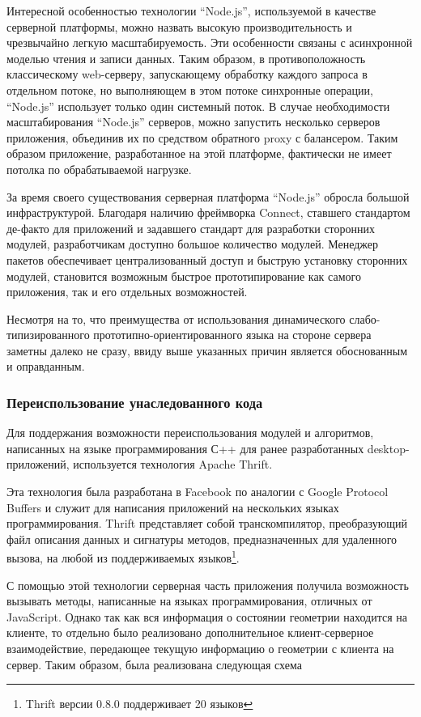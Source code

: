 \documentclass[12pt, a4paper]{article}
\begin{document}
Интересной особенностью технологии ``Node.js'', используемой в качестве серверной
платформы, можно назвать высокую производительность и чрезвычайно легкую
масштабируемость. Эти особенности связаны с асинхронной моделью чтения и записи
данных. Таким образом, в противоположность классическому web-серверу,
запускающему обработку каждого запроса в отдельном потоке, но выполняющем в этом
потоке синхронные операции, ``Node.js'' использует только один системный поток.
В случае необходимости масштабирования ``Node.js'' серверов, можно запустить
несколько серверов приложения, объединив их по средством обратного proxy с
балансером. Таким образом приложение, разработанное на этой платформе,
фактически не имеет потолка по обрабатываемой нагрузке.

За время своего существования серверная платформа ``Node.js'' обросла большой
инфраструктурой. Благодаря наличию фреймворка Connect, ставшего стандартом
де-факто для приложений и задавшего стандарт для разработки сторонних модулей,
разработчикам доступно большое количество модулей. Менеджер пакетов обеспечивает
централизованный доступ и быструю установку сторонних модулей, становится
возможным быстрое прототипирование как самого приложения, так и его отдельных
возможностей.

Несмотря на то, что преимущества от использования динамического
слабо-типизированного прототипно-ориентированного языка на стороне сервера
заметны далеко не сразу, ввиду выше указанных причин является
обоснованным и оправданным.

\subsubsection{Переиспользование унаследованного кода}

Для поддержания возможности переиспользования модулей и алгоритмов, написанных
на языке программирования С++ для ранее разработанных desktop-приложений,
используется технология Apache Thrift.

Эта технология была разработана в Facebook по аналогии с Google Protocol Buffers
и служит для написания приложений на нескольких языках программирования. Thrift
представляет собой транскомпилятор, преобразующий файл описания данных и
сигнатуры методов, предназначенных для удаленного вызова, на любой из
поддерживаемых языков\footnote{Thrift версии 0.8.0 поддерживает 20 языков}.

С помощью этой технологии серверная часть приложения получила возможность
вызывать методы, написанные на языках программирования, отличных от JavaScript.
Однако так как вся информация о состоянии геометрии находится на клиенте, то
отдельно было реализовано дополнительное клиент-серверное взаимодействие,
передающее текущую информацию о геометрии с клиента на сервер. Таким образом,
была реализована следующая схема
\end{document}
